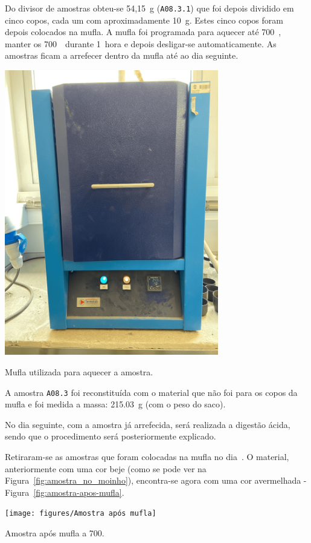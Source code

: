 Do divisor de amostras obteu-se 54,15~g (\texttt{A08.3.1}) que foi depois dividido em cinco copos, cada um com aproximadamente 10~g.
Estes cinco copos foram depois colocados na mufla.
A mufla foi programada para aquecer até 700~\graus, manter os 700~\graus \, durante 1~hora e depois desligar-se automaticamente.
As amostras ficam a arrefecer dentro da mufla até ao dia seguinte.
\begin{marginfigure}[1\baselineskip]
    \centering
    \includegraphics[width=0.7\textwidth]{figures/Mufla}
    \caption{Mufla utilizada para aquecer a amostra.}
    \label{fig:mufla}
\end{marginfigure}

A amostra \texttt{A08.3} foi reconstituída com o material que não foi para os copos da mufla e foi medida a massa: 215.03~g (com o peso do saco).

No dia seguinte, com a amostra já arrefecida, será realizada a digestão ácida, sendo que o procedimento será posteriormente explicado.

\hrulefill


\label{day:8-novembro-2024}

Retiraram-se as amostras que foram colocadas na mufla no dia~.
O material, anteriormente com uma cor beje (como se pode ver na Figura~\ref{fig:amostra_no_moinho}), encontra-se agora com uma cor avermelhada - Figura~\ref{fig:amostra-apos-mufla}.
\begin{marginfigure}[-3\baselineskip]
    \centering
    \texttt{[image: figures/Amostra após mufla]}
    \caption{Amostra após mufla a 700\graus.}
    \label{fig:amostra-apos-mufla}
\end{marginfigure}

